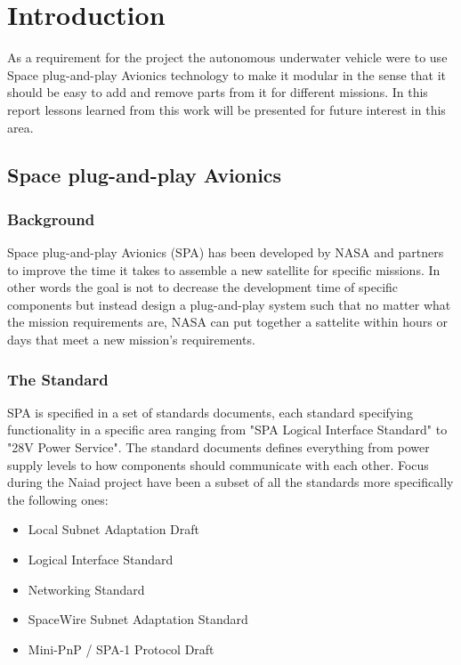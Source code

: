 \section{Introduction}\label{sec:introduction}
As a requirement for the project the autonomous underwater vehicle were to use
Space plug-and-play Avionics technology to make it modular in the sense that
it should be easy to add and remove parts from it for different missions. In
this report lessons learned from this work will be presented for future
interest in this area.

\subsection{Space plug-and-play Avionics}
\subsubsection{Background}
Space plug-and-play Avionics (SPA) has been developed by NASA and partners to
improve the time it takes to assemble a new satellite for specific missions.
In other words the goal is not to decrease the development time of specific
components but instead design a plug-and-play system such that no matter what
the mission requirements are, NASA can put together a sattelite within hours or
days that meet a new mission's requirements.

\subsubsection{The Standard}
SPA is specified in a set of standards documents, each standard specifying
functionality in a specific area ranging from "SPA Logical Interface Standard"
to "28V Power Service". The standard documents defines everything from power
supply levels to how components should communicate with each other.
Focus during the Naiad project have
been a subset of all the standards more specifically the following ones:

\begin{itemize}
  \item Local Subnet Adaptation Draft
  \item Logical Interface Standard \cite{spa:logical_interface}
  \item Networking Standard \cite{spa:networking}
  \item SpaceWire Subnet Adaptation Standard \cite{spa:spacewire}
  \item Mini-PnP / SPA-1 Protocol Draft
\end{itemize}

